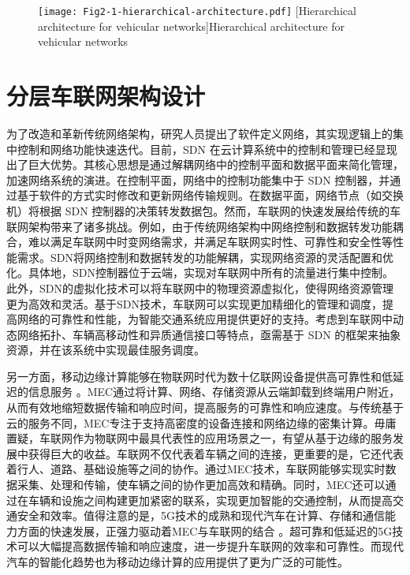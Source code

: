 \begin{figure}[h] 
	\centering
	\texttt{[image: Fig2-1-hierarchical-architecture.pdf]}
	[Hierarchical architecture for vehicular networks]{Hierarchical architecture for vehicular networks}
	\label{fig 2-1}
\end{figure}

\section[\hspace{-2pt}分层车联网架构设计]{{ \hspace{-8pt}分层车联网架构设计}}\label{section 2-2}

为了改造和革新传统网络架构，研究人员提出了软件定义网络\cite{wang2020ji}，其实现逻辑上的集中控制和网络功能快速迭代。目前，SDN 在云计算系统中的控制和管理已经显现出了巨大优势\cite{jain2013network}。其核心思想是通过解耦网络中的控制平面和数据平面来简化管理，加速网络系统的演进。在控制平面，网络中的控制功能集中于 SDN 控制器，并通过基于软件的方式实时修改和更新网络传输规则。在数据平面，网络节点（如交换机）将根据 SDN 控制器的决策转发数据包。然而，车联网的快速发展给传统的车联网架构带来了诸多挑战。例如，由于传统网络架构中网络控制和数据转发功能耦合，难以满足车联网中时变网络需求，并满足车联网实时性、可靠性和安全性等性能需求。SDN将网络控制和数据转发的功能解耦，实现网络资源的灵活配置和优化。具体地，SDN控制器位于云端，实现对车联网中所有的流量进行集中控制。此外，SDN的虚拟化技术可以将车联网中的物理资源虚拟化，使得网络资源管理更为高效和灵活。基于SDN技术，车联网可以实现更加精细化的管理和调度，提高网络的可靠性和性能，为智能交通系统应用提供更好的支持。考虑到车联网中动态网络拓扑、车辆高移动性和异质通信接口等特点，亟需基于 SDN 的框架来抽象资源，并在该系统中实现最佳服务调度。

另一方面，移动边缘计算能够在物联网时代为数十亿联网设备提供高可靠性和低延迟的信息服务 \cite{shi2016edge}。MEC通过将计算、网络、存储资源从云端卸载到终端用户附近，从而有效地缩短数据传输和响应时间，提高服务的可靠性和响应速度。与传统基于云的服务不同，MEC专注于支持高密度的设备连接和网络边缘的密集计算。毋庸置疑，车联网作为物联网中最具代表性的应用场景之一，有望从基于边缘的服务发展中获得巨大的收益。车联网不仅代表着车辆之间的连接，更重要的是，它还代表着行人、道路、基础设施等之间的协作。通过MEC技术，车联网能够实现实时数据采集、处理和传输，使车辆之间的协作更加高效和精确。同时，MEC还可以通过在车辆和设施之间构建更加紧密的联系，实现更加智能的交通控制，从而提高交通安全和效率。值得注意的是，5G技术的成熟和现代汽车在计算、存储和通信能力方面的快速发展，正强力驱动着MEC与车联网的结合 \cite{li2021che}。超可靠和低延迟的5G技术可以大幅提高数据传输和响应速度，进一步提升车联网的效率和可靠性。而现代汽车的智能化趋势也为移动边缘计算的应用提供了更为广泛的可能性。

